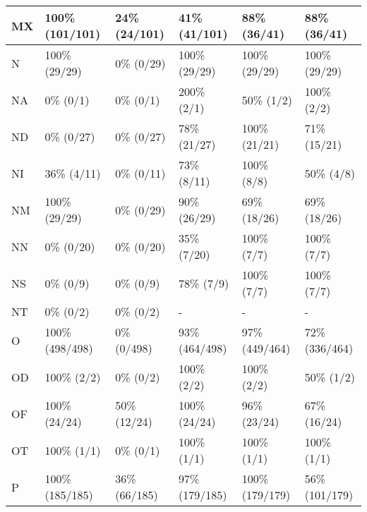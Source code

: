 \begin{figure*}
\begin{tabular}{|l|l|l|l|l|l|}
\hline
MX & 100\% (101/101) & 24\% (24/101) & 41\% (41/101) & 88\% (36/41) & 88\% (36/41) \\ 
\hline
N & 100\% (29/29) & 0\% (0/29) & 100\% (29/29) & 100\% (29/29) & 100\% (29/29) \\ 
\hline
NA & 0\% (0/1) & 0\% (0/1) & 200\% (2/1) & 50\% (1/2) & 100\% (2/2) \\ 
\hline
ND & 0\% (0/27) & 0\% (0/27) & 78\% (21/27) & 100\% (21/21) & 71\% (15/21) \\ 
\hline
NI & 36\% (4/11) & 0\% (0/11) & 73\% (8/11) & 100\% (8/8) & 50\% (4/8) \\ 
\hline
NM & 100\% (29/29) & 0\% (0/29) & 90\% (26/29) & 69\% (18/26) & 69\% (18/26) \\ 
\hline
NN & 0\% (0/20) & 0\% (0/20) & 35\% (7/20) & 100\% (7/7) & 100\% (7/7) \\ 
\hline
NS & 0\% (0/9) & 0\% (0/9) & 78\% (7/9) & 100\% (7/7) & 100\% (7/7) \\ 
\hline
NT & 0\% (0/2) & 0\% (0/2) & - & - & - \\ 
\hline
O & 100\% (498/498) & 0\% (0/498) & 93\% (464/498) & 97\% (449/464) & 72\% (336/464) \\ 
\hline
OD & 100\% (2/2) & 0\% (0/2) & 100\% (2/2) & 100\% (2/2) & 50\% (1/2) \\ 
\hline
OF & 100\% (24/24) & 50\% (12/24) & 100\% (24/24) & 96\% (23/24) & 67\% (16/24) \\ 
\hline
OT & 100\% (1/1) & 0\% (0/1) & 100\% (1/1) & 100\% (1/1) & 100\% (1/1) \\ 
\hline
P & 100\% (185/185) & 36\% (66/185) & 97\% (179/185) & 100\% (179/179) & 56\% (101/179) \\ 
\hline
\end{tabular}
\end{figure*}
